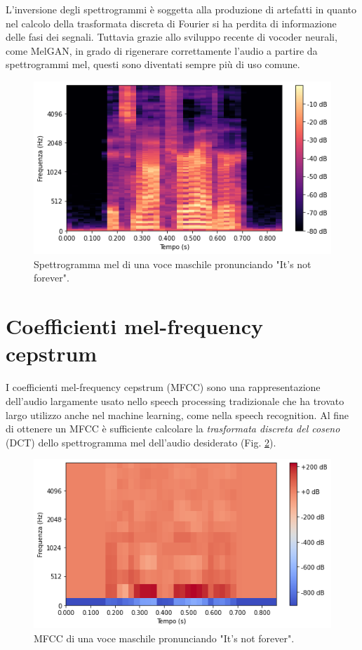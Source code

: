 		L'inversione degli spettrogrammi è soggetta alla produzione di artefatti in quanto nel calcolo della trasformata discreta di Fourier si ha perdita di informazione delle fasi dei segnali. Tuttavia grazie allo sviluppo recente di vocoder neurali, come MelGAN\cite{melgan}, in grado di rigenerare correttamente l'audio a partire da spettrogrammi mel, questi sono diventati sempre più di uso comune.
		\begin{figure}%
			\centering
			\includegraphics[width=0.75\linewidth]{figures/melspectrogram}
			\caption{Spettrogramma mel di una voce maschile pronunciando "It's not forever".}
			\label{fig:spettrogramma-mel}
		\end{figure}
	
		\section{Coefficienti mel-frequency cepstrum}
		I coefficienti mel-frequency cepstrum (MFCC)\cite{mel-frequency-cepstral} sono una rappresentazione dell'audio largamente usato nello speech processing tradizionale che ha trovato largo utilizzo anche nel machine learning, come nella speech recognition. Al fine di ottenere un MFCC è sufficiente calcolare la \textit{trasformata discreta del coseno} (DCT) dello spettrogramma mel dell'audio desiderato (Fig. \ref{fig:mfcc}).
		\begin{figure}%
			\centering
			\includegraphics[width=0.75\linewidth]{figures/mfcc}
			\caption{MFCC di una voce maschile pronunciando "It's not forever".}
			\label{fig:mfcc}
		\end{figure}
		
